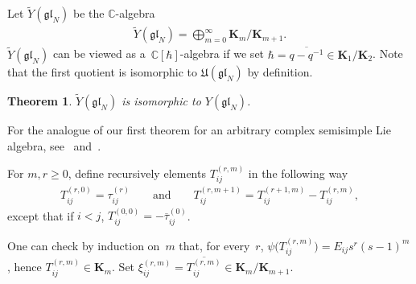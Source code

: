 \documentclass[11pt]{article}
\newtheorem{theorem}{Theorem}
\numberwithin{theorem}{section}
\numberwithin{proposition}{section}
\numberwithin{lemma}{section}
\numberwithin{corollary}{section}
\numberwithin{definition}{section}
\numberwithin{example}{section}
\numberwithin{remark}{section}
\numberwithin{note}{section}
\numberwithin{equation}{section}
\begin{document}
Let $\widetilde{Y}(\mathfrak{gl}_N)$ be the $\mathbb{C}$-algebra
\begin{gather*}
\widetilde{Y}(\mathfrak{gl}_N) = \bigoplus_{m=0}^{\infty} \mathbf{K}_{m}/\mathbf{K}_{m+1}.
\end{gather*}
$\widetilde{Y}(\mathfrak{gl}_N)$ can be viewed as a~$\mathbb{C}[\hbar]$-algebra if we set
$\hbar=\overline{q-q^{-1}} \in \mathbf{K}_1/\mathbf{K}_2$.
Note that the f\/irst quotient is isomorphic to $\mathfrak{U}(\mathfrak{gl}_N)$ by def\/inition.

\begin{theorem}
\label{mainthm}
$ \widetilde{Y}(\mathfrak{gl}_N)$ is isomorphic to $Y(\mathfrak{gl}_N)$.
\end{theorem}

For the analogue of our f\/irst theorem for an arbitrary complex semisimple Lie algebra, see~\cite{Dr1} and~\cite{GuMa}.

For $m,r\ge 0$, def\/ine recursively elements $T_{ij}^{(r,m)}$ in the following way
\begin{gather*}
T_{ij}^{(r,0)} = \tau_{ij}^{(r)} \qquad\text{and}\qquad T_{ij}^{(r,m+1)} = T_{ij}^{(r+1,m)} - T_{ij}^{(r,m)},
\end{gather*}
except that if $i<j$, $T_{ij}^{(0,0)} = -\overline{\tau}_{ij}^{(0)}$.

{\sloppy One can check by induction on~$m$ that, for every~$r$, $\psi\big(T_{ij}^{(r,m)}\big)=E_{ij}s^r(s-1)^m$, hence $T_{ij}^{(r,m)}
\in \mathbf{K}_m$.
Set $\xi_{ij}^{(r,m)} = \overline{T_{ij}^{(r,m)}} \in \mathbf{K}_m/\mathbf{K}_{m+1}$.

}
\end{document}
